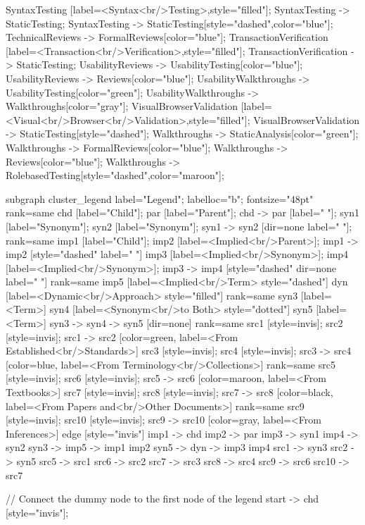 \documentclass{article}
\begin{document}
{SyntaxTesting [label=<Syntax<br/>Testing>,style="filled"];
SyntaxTesting -> StaticTesting;
SyntaxTesting -> StaticTesting[style="dashed",color="blue"];
TechnicalReviews -> FormalReviews[color="blue"];
TransactionVerification [label=<Transaction<br/>Verification>,style="filled"];
TransactionVerification -> StaticTesting;
UsabilityReviews -> UsabilityTesting[color="blue"];
UsabilityReviews -> Reviews[color="blue"];
UsabilityWalkthroughs -> UsabilityTesting[color="green"];
UsabilityWalkthroughs -> Walkthroughs[color="gray"];
VisualBrowserValidation [label=<Visual<br/>Browser<br/>Validation>,style="filled"];
VisualBrowserValidation -> StaticTesting[style="dashed"];
Walkthroughs -> StaticAnalysis[color="green"];
Walkthroughs -> FormalReviews[color="blue"];
Walkthroughs -> Reviews[color="blue"];
Walkthroughs -> RolebasedTesting[style="dashed",color="maroon"];

subgraph cluster_legend {
    label="Legend";
    labelloc="b";
    fontsize="48pt"
    {
        rank=same
        chd [label="Child"];
        par [label="Parent"];
        chd -> par [label="                "];
        syn1 [label="Synonym"];
        syn2 [label="Synonym"];
        syn1 -> syn2 [dir=none label="                "];
    }
    {
        rank=same
        imp1 [label="Child"];
        imp2 [label=<Implied<br/>Parent>];
        imp1 -> imp2 [style="dashed" label="                "]
        imp3 [label=<Implied<br/>Synonym>];
        imp4 [label=<Implied<br/>Synonym>];
        imp3 -> imp4 [style="dashed" dir=none label="                "]
    }
    {
        rank=same
        imp5 [label=<Implied<br/>Term> style="dashed"]
        dyn [label=<Dynamic<br/>Approach> style="filled"]
    }
    {
        rank=same
        syn3 [label=<Term>]
        syn4 [label=<Synonym<br/>to Both> style="dotted"]
        syn5 [label=<Term>]
        syn3 -> syn4 -> syn5 [dir=none]
    }
{
rank=same
src1 [style=invis];
src2 [style=invis];
src1 -> src2 [color=green, label=<From Established<br/>Standards>]
src3 [style=invis];
src4 [style=invis];
src3 -> src4 [color=blue, label=<From Terminology<br/>Collections>]
}
{
rank=same
src5 [style=invis];
src6 [style=invis];
src5 -> src6 [color=maroon, label=<From Textbooks>]
src7 [style=invis];
src8 [style=invis];
src7 -> src8 [color=black, label=<From Papers and<br/>Other Documents>]
}
{
rank=same
src9 [style=invis];
src10 [style=invis];
src9 -> src10 [color=gray, label=<From Inferences>]
}
    edge [style="invis"]
    imp1 -> chd
    imp2 -> par
    imp3 -> syn1
    imp4 -> syn2
syn3 -> imp5 -> { imp1 imp2 }
syn5 -> dyn -> { imp3 imp4 }
src1 -> syn3
src2 -> syn5
src5 -> src1
src6 -> src2
src7 -> src3
src8 -> src4
src9 -> src6
src10 -> src7
}

// Connect the dummy node to the first node of the legend
start -> chd [style="invis"];
}
\end{document}
